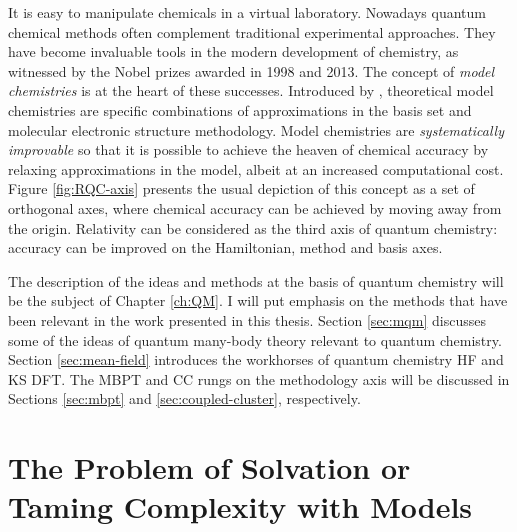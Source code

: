 It is easy to manipulate chemicals in a virtual laboratory. Nowadays
quantum chemical methods often complement traditional experimental
approaches. They have become invaluable tools in the modern development
of chemistry,\autocite{Lee1995-pw, Helgaker2004-oz, Tajti2004-ye} as
witnessed by the Nobel prizes awarded in 1998\autocite{Nobel1998} and
2013.\autocite{Nobel2013}
The concept of \emph{model chemistries} is at the heart of these
successes. Introduced by \citeauthor{Pople1999-gt}, theoretical model
chemistries are specific combinations of approximations in the basis set
and molecular electronic structure methodology.\autocite{Pople1999-gt}
Model chemistries are \emph{systematically improvable} so that it is
possible to achieve the heaven of chemical accuracy by relaxing
approximations in the model, albeit at an increased computational cost.
Figure \ref{fig:RQC-axis} presents the usual depiction of this concept
as a set of orthogonal axes, where chemical accuracy can be achieved by
moving away from the origin.
Relativity can be considered as the third axis of quantum
chemistry: accuracy can be improved on the Hamiltonian, method
and basis axes.\autocite{Saue2011-qg}

The description of the ideas and methods at the basis of quantum
chemistry will be the subject of Chapter \ref{ch:QM}.
I will put emphasis on the methods that have been relevant in the work
presented in this thesis. Section \ref{sec:mqm} discusses some of the
ideas of quantum many-body theory relevant to quantum chemistry. Section
\ref{sec:mean-field} introduces the workhorses of quantum chemistry
\acrlong*{HF} and \acrlong*{KS} \acrlong*{DFT}.
The \acrlong*{MBPT} and \acrlong*{CC} rungs on the methodology axis will
be discussed in Sections \ref{sec:mbpt} and \ref{sec:coupled-cluster},
respectively.

\section*{The Problem of Solvation or Taming Complexity with Models}

